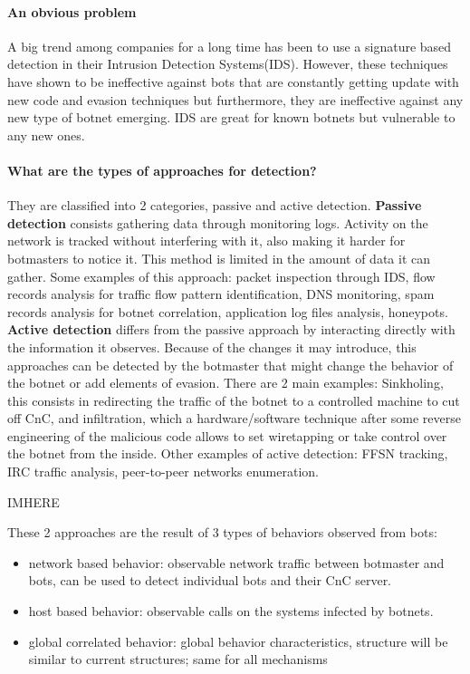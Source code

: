 \paragraph{An obvious problem} A big trend among companies for a long time has been to use a signature based detection in their Intrusion Detection Systems(IDS)\cite{bot-ml}. However, these techniques have shown to be ineffective against bots that are constantly getting update with new code and evasion techniques but furthermore, they are ineffective against any new type of botnet emerging. IDS are great for known botnets but vulnerable to any new ones\cite{snort}.

\paragraph{What are the types of approaches for detection?}
They are classified into 2 categories, passive and active detection\cite{detection9}. \textbf{Passive detection} consists gathering data through monitoring logs. Activity on the network is tracked without interfering with it, also making it harder for botmasters to notice it. This method is limited in the amount of data it can gather. Some examples of this approach: packet inspection through IDS, flow records analysis for traffic flow pattern identification, DNS monitoring, spam records analysis for botnet correlation, application log files analysis, honeypots. \textbf{Active detection} differs from the passive approach by interacting directly with the information it observes. Because of the changes it may introduce, this approaches can be detected by the botmaster that might change the behavior of the botnet or add elements of evasion. There are 2 main examples: Sinkholing, this consists in redirecting the traffic of the botnet to a controlled machine to cut off CnC, and infiltration, which a hardware/software technique after some reverse engineering of the malicious code allows to set wiretapping or take control over the botnet from the inside. Other examples of active detection: FFSN tracking, IRC traffic analysis, peer-to-peer networks enumeration.

IMHERE

These 2 approaches are the result of 3 types of behaviors observed from bots\cite{bot-threat1}: 
\begin{itemize}
\item network based behavior: observable network traffic between botmaster and bots, can be used to detect individual bots and their CnC server. 
\item host based behavior: observable calls on the systems infected by botnets. 
\item global correlated behavior: global behavior characteristics, structure will be similar to current structures; same for all mechanisms
\end{itemize}

